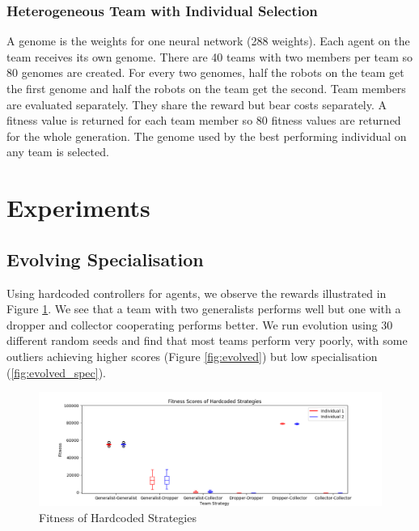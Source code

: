 \documentclass[12pt]{article}  %
\begin{document}
\subsubsection{Heterogeneous Team with Individual Selection}

A genome is the weights for one neural network (288 weights).
Each agent on the team receives its own genome.
There are 40 teams with two members per team so 80 genomes are created.  
For every two genomes, half the robots on the team get the first genome and half the robots on the team get the second. 
Team members are evaluated separately. 
They share the reward but bear costs separately. 
A fitness value is returned for each team member so 80 fitness values are returned for the whole generation. 
The genome used by the best performing individual on any team is selected. \\



\section{Experiments}

\subsection{Evolving Specialisation}
Using hardcoded controllers for agents, we observe the rewards illustrated in Figure \ref{fig:hardcoded}. We see that a team with two generalists performs well but one with a dropper and collector cooperating performs better. We run evolution using 30 different random seeds and find that most teams perform very poorly, with some outliers achieving higher scores (Figure \ref{fig:evolved}) but low specialisation (\ref{fig:evolved_spec}). \\

\begin{figure}
	\centering
	\includegraphics[width=\textwidth]{hardcoded_fitness.png}
	\caption{Fitness of Hardcoded Strategies}
	\label{fig:hardcoded}
\end{figure}
\end{document}
